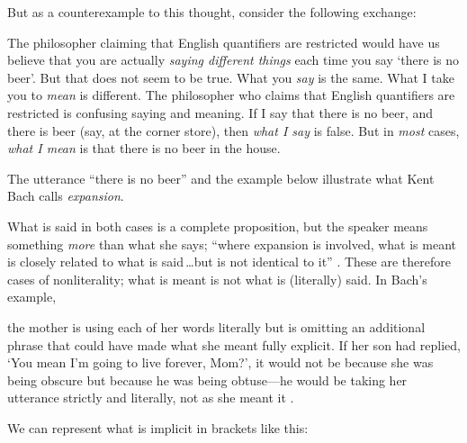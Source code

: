 \documentclass[11pt]{article}
\newenvironment{squote}{%
\begin{spacing}{1}
       	\begin{list}{}{%
\setlength{\labelwidth}{0pt}%
\rightmargin\leftmargin%
}
\item\relax
}{%
\end{list}%
\end{spacing}
}
\begin{document}
\begin{spacing}{1.25}
But as a counterexample to this thought, consider the following
exchange:







The philosopher claiming that English quantifiers are restricted would
have us believe that you are actually {\em saying different things}
each time you say `there is no beer'.  But that does not seem to be
true.  What you {\em say} is the same.  What I take you to {\em mean}
is different.  The philosopher who claims that English quantifiers are
restricted is confusing saying and meaning.  If I say that there is no
beer, and there is beer (say, at the corner store), then {\em what I
  say} is false.  But in {\em most} cases, {\em what I mean} is that
there is no beer in the house.

The utterance ``there is no beer'' and the example below illustrate
what Kent Bach calls {\em expansion}.


What is said in both cases is a complete proposition, but the speaker
means something {\em more} than what she says; ``where expansion is
involved, what is meant is closely related to what is said\,\ldots but
is not identical to it'' \citep{bach1994}.  These are therefore cases
of nonliterality; what is meant is not what is (literally) said.  In
Bach's example,

\begin{squote}
the mother is using each of her words literally but is omitting an
additional phrase that could have made what she meant fully explicit.
If her son had replied, `You mean I'm going to live forever, Mom?', it
would not be because she was being obscure but because he was being
obtuse---he would be taking her utterance strictly and literally, not
as she meant it \citeyearpar{bach1994}.
\end{squote}

We can represent what is implicit in brackets like this:



\end{spacing}
\end{document}
